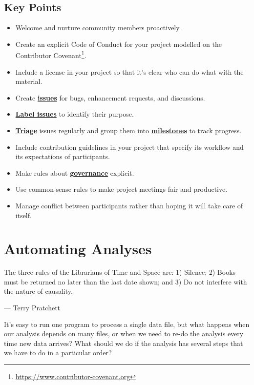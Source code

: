 \documentclass[
]{krantz}
\providecommand{\tightlist}{%
  \setlength{\itemsep}{0pt}\setlength{\parskip}{0pt}}
\renewenvironment{quote}{\begin{VF}}{\end{VF}}
\renewcommand{\href}[2]{#2\footnote{\url{#1}}}
\newcommand{\gref}[2]{\hyperlink{#2}{\textbf{#1}}}
\begin{document}
\hypertarget{teams-keypoints}{%
\section{Key Points}\label{teams-keypoints}}

\begin{itemize}
\tightlist
\item
  Welcome and nurture community members proactively.
\item
  Create an explicit Code of Conduct for your project modelled on the \href{https://www.contributor-covenant.org}{Contributor Covenant}.
\item
  Include a license in your project so that it's clear who can do what with the material.
\item
  Create \gref{issues}{issue} for bugs, enhancement requests, and discussions.
\item
  \gref{Label issues}{issue\_label} to identify their purpose.
\item
  \gref{Triage}{triage} issues regularly and group them into \gref{milestones}{milestone} to track progress.
\item
  Include contribution guidelines in your project that specify its workflow and its expectations of participants.
\item
  Make rules about \gref{governance}{governance} explicit.
\item
  Use common-sense rules to make project meetings fair and productive.
\item
  Manage conflict between participants rather than hoping it will take care of itself.
\end{itemize}

\hypertarget{automate}{%
\chapter{Automating Analyses}\label{automate}}

\begin{quote}
The three rules of the Librarians of Time and Space are:
1) Silence;
2) Books must be returned no later than the last date shown; and
3) Do not interfere with the nature of causality.

--- Terry Pratchett
\end{quote}

It's easy to run one program to process a single data file,
but what happens when our analysis depends on many files,
or when we need to re-do the analysis every time new data arrives?
What should we do if the analysis has several steps
that we have to do in a particular order?
\end{document}
